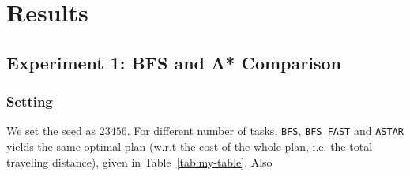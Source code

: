 \documentclass[10.5pt]{article}
\begin{document}
\section{Results}

\subsection{Experiment 1: BFS and A* Comparison}

\subsubsection{Setting}
We set the seed as $23456$. For different number of tasks, \texttt{BFS}, \texttt{BFS\_FAST} and \texttt{ASTAR} yields the same optimal plan (w.r.t the cost of the whole plan, i.e. the total traveling distance), given in Table~\ref{tab:my-table}. Also
\end{document}
